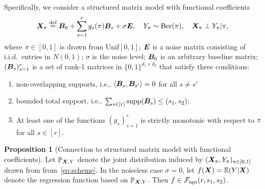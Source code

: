\documentclass[11pt]{article}
\theoremstyle{plain}
\theoremstyle{definition}
\newtheorem{prop}{Proposition}
\def\caliF{\tF_{\textup{sgn}}}
\def\caliF{\tF_{\textup{sgn}}}
\begin{document}
Specifically, we consider a structured matrix model with functional coefficients
\begin{equation}\label{eq:scheme}
\bm X_\pi\stackrel{\text{def}}{=}\bm B_0+ \sum_{s=1}^rg_s(\pi)\bm B_s+\sigma \bm{E},\quad Y_\pi\sim\text{Ber}(\pi),\quad \bm X_\pi \perp Y_\pi |\pi,
\end{equation}
where $\pi \in[0,1]$ is drawn from $\text{Unif}[0,1]$; $\bm{E}$ is a noise matrix consisting of i.i.d.\ entries in $N(0,1)$; $\sigma$ is the noise level; $\bm B_0$ is an arbitrary baseline matrix; $(\bm B_s)_{s=1}^r$ is a set of rank-1 matrices in $\{0,1\}^{d_1\times d_2}$ that satisfy three conditions:
\begin{enumerate}
\item non-overlapping supports, i.e., $\langle \bm B_s, \bm B_{s'}\rangle=0$ for all $s\neq s'$
\item bounded total support, i.e., $\sum_{s\in[r]}\text{supp}(\bm B_s)\leq (s_1,s_2)$;
\item At least one of the functions $(g_s)_{s=1}^r$ is strictly monotonic with respect to $\pi$ for all $s\in[r]$. \\
\end{enumerate}

\begin{prop}[Connection to structured matrix model with functional coefficients] Let $\mathbb{P}_{\bm X,Y}$ denote the joint distribution induced by $(\bm X_\pi,Y_\pi)_{\pi\in[0,1]}$ drawn from from~\eqref{eq:scheme}. In the noiseless case $\sigma = 0$, let $f(\bm X)=\mathbb{E}(Y|\bm X)$ denote the regression function based on $\mathbb{P}_{\bm X,Y}$. Then $f\in\caliF(r,s_1,s_2)$.
\end{prop}
\end{document}
